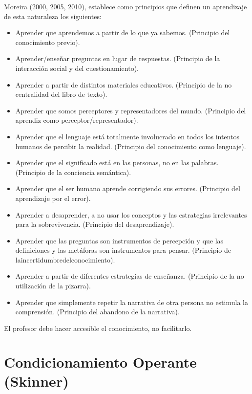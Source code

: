\documentclass[12pt]{report}
\newcounter{it}
\theoremstyle{largebreak}
\begin{document}
    Moreira (2000, 2005, 2010), establece como principios
    que definen un aprendizaje de esta naturaleza los siguientes:
    \begin{itemize}
        \item Aprender que aprendemos a partir de lo que ya sabemos. (Principio del
        conocimiento previo).
        \item Aprender/enseñar preguntas en lugar de respuestas. (Principio de la
        interacción social y del cuestionamiento).
        \item Aprender a partir de distintos materiales educativos. (Principio de la no
        centralidad del libro de texto).
        \item Aprender que somos perceptores y representadores del mundo. (Principio
        del aprendiz como perceptor/representador).
        \item Aprender que el lenguaje está totalmente involucrado en todos los intentos
        humanos de percibir la realidad. (Principio del conocimiento como
        lenguaje).
        \item Aprender que el significado está en las personas, no en las palabras.
        (Principio de la conciencia semántica).
        \item Aprender que el ser humano aprende corrigiendo sus errores. (Principio del
        aprendizaje por el error).
        \item Aprender a desaprender, a no usar los conceptos y las estrategias
        irrelevantes para la sobrevivencia. (Principio del desaprendizaje).
        \item Aprender que las preguntas son instrumentos de percepción y que las
        definiciones y las metáforas son instrumentos para pensar. (Principio de
        laincertidumbredelconocimiento).
        \item Aprender a partir de diferentes estrategias de enseñanza. (Principio de la
        no utilización de la pizarra).
        \item Aprender que simplemente repetir la narrativa de otra persona no estimula
        la comprensión. (Principio del abandono de la narrativa).
    \end{itemize}

    El profesor debe hacer accesible el conocimiento, no facilitarlo.

    \section{Condicionamiento Operante (Skinner)}
\end{document}
